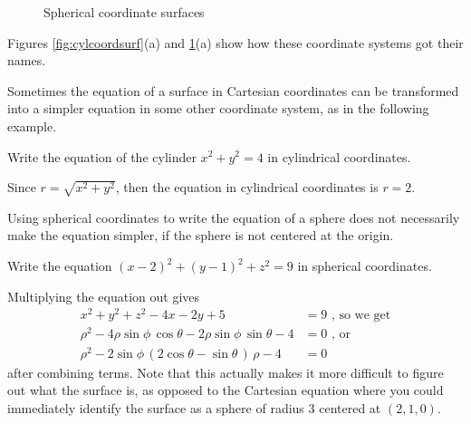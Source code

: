 \begin{figure}[h]
{}
 \caption[]{\quad Spherical coordinate surfaces}
 \label{fig:sphcoordsurf}
\end{figure}

Figures \ref{fig:cylcoordsurf}(a) and \ref{fig:sphcoordsurf}(a) show how these coordinate systems got their names.

Sometimes the equation of a surface in Cartesian coordinates can be transformed into a simpler equation in some other
coordinate system, as in the following example.

\vspace{2mm}
     \begin{exa}
 Write the equation of the cylinder $x^2 + y^2 = 4$ in cylindrical coordinates.\vspace{1mm}
\end{exa}
 \begin{solu}
Since $r = \sqrt{x^2 + y^2}$, then the equation in cylindrical
 coordinates is $r =2$.
 \end{solu}
 
  

Using spherical coordinates to write the equation of a sphere does not necessarily make the
equation simpler, if the sphere is not centered at the origin.

\vspace{2mm}
     \begin{exa}
 Write the equation $(x - 2)^2 + (y - 1)^2 + z^2 = 9$ in spherical coordinates.\vspace{1mm}
\end{exa}

\begin{solu}
Multiplying the equation out gives
 \begin{align*}
  x^2 + y^2 + z^2 - 4x - 2y + 5 &= 9 \text{~, so we get}\\
  \rho^2 - 4 \rho \sin \phi \,\cos \theta - 2 \rho \sin \phi \,\sin \theta - 4 &= 0 \text{~,~or}\\
  \rho^2 - 2 \sin \phi \, ( 2 \cos \theta - \sin \theta \, ) \,\rho - 4 &= 0
 \end{align*}
 after combining terms. Note that this actually makes it more difficult to figure out what the surface is,
 as opposed to the Cartesian equation where you could immediately identify the surface as a sphere of radius $3$ centered
 at $(2,1,0)$.
\end{solu}



